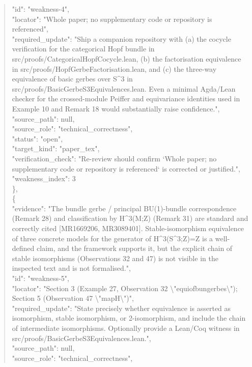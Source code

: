 \documentclass[11pt]{article}
\begin{document}
\begin{quote}
      "id": "weakness-4",\\
      "locator": "Whole paper; no supplementary code or repository is referenced",\\
      "required\_update": "Ship a companion repository with (a) the cocycle verification for the categorical Hopf bundle in src/proofs/CategoricalHopfCocycle.lean, (b) the factorisation equivalence in src/proofs/HopfGerbeFactorisation.lean, and (c) the three-way equivalence of basic gerbes over S\^{}3 in src/proofs/BasicGerbeS3Equivalences.lean. Even a minimal Agda/Lean checker for the crossed-module Peiffer and equivariance identities used in Example 10 and Remark 18 would substantially raise confidence.",\\
      "source\_path": null,\\
      "source\_role": "technical\_correctness",\\
      "status": "open",\\
      "target\_kind": "paper\_tex",\\
      "verification\_check": "Re-review should confirm `Whole paper; no supplementary code or repository is referenced` is corrected or justified.",\\
      "weakness\_index": 3\\
    \},\\
    \{\\
      "evidence": "The bundle gerbe / principal BU(1)-bundle correspondence (Remark 28) and classification by H\^{}3(M;Z) (Remark 31) are standard and correctly cited [MR1669206, MR3089401]. Stable-isomorphism equivalence of three concrete models for the generator of H\^{}3(S\^{}3;Z)=Z is a well-defined claim, and the framework supports it, but the explicit chain of stable isomorphisms (Observations 32 and 47) is not visible in the inspected text and is not formalised.",\\
      "id": "weakness-5",\\
      "locator": "Section 3 (Example 27, Observation 32 \textbackslash{}"equiofbungerbes\textbackslash{}"); Section 5 (Observation 47 \textbackslash{}"mapH\textbackslash{}")",\\
      "required\_update": "State precisely whether equivalence is asserted as isomorphism, stable isomorphism, or 2-isomorphism, and include the chain of intermediate isomorphisms. Optionally provide a Lean/Coq witness in src/proofs/BasicGerbeS3Equivalences.lean.",\\
      "source\_path": null,\\
      "source\_role": "technical\_correctness",\\

\end{quote}
\end{document}
